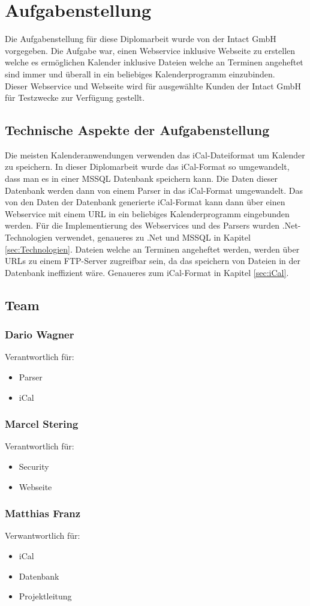 \chapter{Aufgabenstellung}
\label{sec:Aufgabenstellung}
Die Aufgabenstellung für diese Diplomarbeit wurde von der Intact GmbH vorgegeben. Die Aufgabe war, einen Webservice inklusive Webseite zu erstellen welche es ermöglichen Kalender inklusive Dateien welche an Terminen angeheftet sind immer und überall in ein beliebiges Kalenderprogramm einzubinden. \\
Dieser Webservice und Webseite wird für ausgewählte Kunden der Intact GmbH für Testzwecke zur Verfügung gestellt. \\

\section{Technische Aspekte der Aufgabenstellung}
\label{sec:TechnischeAspekteDerAufgabenstellung}
Die meisten Kalenderanwendungen verwenden das iCal-Dateiformat um Kalender zu speichern. In dieser Diplomarbeit wurde das iCal-Format so umgewandelt, dass man es in einer MSSQL Datenbank speichern kann. Die Daten dieser Datenbank werden dann von einem Parser in das iCal-Format umgewandelt. Das von den Daten der Datenbank generierte iCal-Format kann dann über einen Webservice mit einem URL in ein beliebiges Kalenderprogramm eingebunden werden. Für die Implementierung des Webservices und des Parsers wurden .Net-Technologien verwendet, genaueres zu .Net und MSSQL in Kapitel \ref{sec:Technologien}.  Dateien welche an Terminen angeheftet werden, werden über URLs zu einem FTP-Server zugreifbar sein, da das speichern von Dateien in der Datenbank ineffizient wäre. Genaueres zum iCal-Format in Kapitel \ref{sec:iCal}.
\pagebreak

\section{Team} %
\label{sec:Team}
	\subsection*{Dario Wagner}
		Verantwortlich für: 
		\begin{itemize}
			\item Parser
			\item iCal
		\end{itemize}
	\subsection*{Marcel Stering}
		Verantwortlich für: 
		\begin{itemize}
			\item Security
			\item Webseite
		\end{itemize}
	\subsection*{Matthias Franz}
		Verwantwortlich für: 
		\begin{itemize}
			\item iCal
			\item Datenbank
			\item Projektleitung
		\end{itemize}				